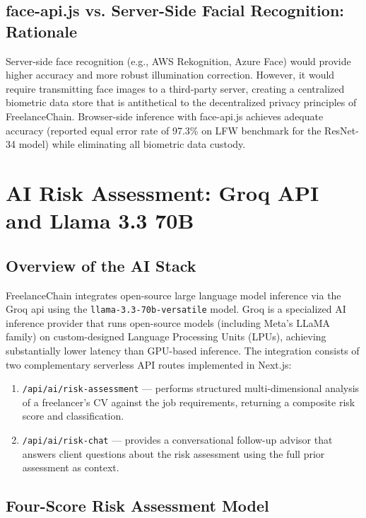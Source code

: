 \subsection{face-api.js vs. Server-Side Facial Recognition: Rationale}

Server-side face recognition (e.g., AWS Rekognition, Azure Face) would provide higher accuracy and more robust illumination correction. However, it would require transmitting face images to a third-party server, creating a centralized biometric data store that is antithetical to the decentralized privacy principles of FreelanceChain. Browser-side inference with face-api.js achieves adequate accuracy (reported equal error rate of 97.3\% on LFW benchmark for the ResNet-34 model) while eliminating all biometric data custody.

\section{AI Risk Assessment: Groq API and Llama 3.3 70B}
\label{section:3.6}

\subsection{Overview of the AI Stack}

FreelanceChain integrates open-source large language model inference via the Groq \gls{api} using the \texttt{llama-3.3-70b-versatile} model. Groq is a specialized AI inference provider that runs open-source models (including Meta's LLaMA family) on custom-designed Language Processing Units (LPUs), achieving substantially lower latency than GPU-based inference. The integration consists of two complementary serverless API routes implemented in Next.js:

\begin{enumerate}
    \item \texttt{/api/ai/risk-assessment} --- performs structured multi-dimensional analysis of a freelancer's CV against the job requirements, returning a composite risk score and classification.
    \item \texttt{/api/ai/risk-chat} --- provides a conversational follow-up advisor that answers client questions about the risk assessment using the full prior assessment as context.
\end{enumerate}

\subsection{Four-Score Risk Assessment Model}

